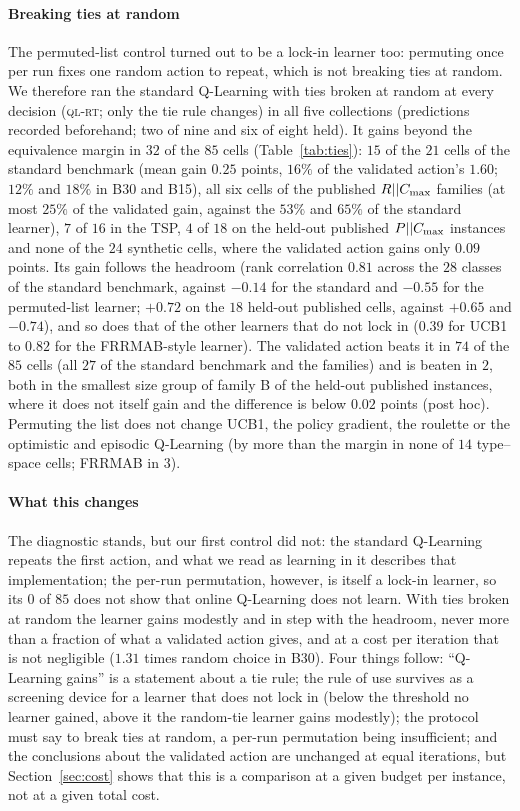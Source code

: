 \paragraph{Breaking ties at random} The permuted-list control turned out to be a lock-in learner too: permuting once per run fixes one random action to repeat, which is not breaking ties at random. We therefore ran the standard Q-Learning with ties broken at random at every decision (\textsc{ql-rt}; only the tie rule changes) in all five collections (predictions recorded beforehand; two of nine and six of eight held). It gains beyond the equivalence margin in $32$ of the $85$ cells (Table~\ref{tab:ties}): $15$ of the $21$ cells of the standard benchmark (mean gain $0.25$ points, $16\%$ of the validated action's $1.60$; $12\%$ and $18\%$ in B30 and B15), all six cells of the published $R||C_{\max}$ families (at most $25\%$ of the validated gain, against the $53\%$ and $65\%$ of the standard learner), $7$ of $16$ in the TSP, $4$ of $18$ on the held-out published $P||C_{\max}$ instances and none of the $24$ synthetic cells, where the validated action gains only $0.09$ points. Its gain follows the headroom (rank correlation $0.81$ across the $28$ classes of the standard benchmark, against $-0.14$ for the standard and $-0.55$ for the permuted-list learner; $+0.72$ on the $18$ held-out published cells, against $+0.65$ and $-0.74$), and so does that of the other learners that do not lock in ($0.39$ for UCB1 to $0.82$ for the FRRMAB-style learner). The validated action beats it in $74$ of the $85$ cells (all $27$ of the standard benchmark and the families) and is beaten in $2$, both in the smallest size group of family B of the held-out published instances, where it does not itself gain and the difference is below $0.02$ points (post hoc). Permuting the list does not change UCB1, the policy gradient, the roulette or the optimistic and episodic Q-Learning (by more than the margin in none of $14$ type--space cells; FRRMAB in $3$).



\paragraph{What this changes} The diagnostic stands, but our first control did not: the standard Q-Learning repeats the first action, and what we read as learning in it describes that implementation; the per-run permutation, however, is itself a lock-in learner, so its $0$ of $85$ does not show that online Q-Learning does not learn. With ties broken at random the learner gains modestly and in step with the headroom, never more than a fraction of what a validated action gives, and at a cost per iteration that is not negligible ($1.31$ times random choice in B30). Four things follow: ``Q-Learning gains'' is a statement about a tie rule; the rule of use survives as a screening device for a learner that does not lock in (below the threshold no learner gained, above it the random-tie learner gains modestly); the protocol must say to break ties at random, a per-run permutation being insufficient; and the conclusions about the validated action are unchanged at equal iterations, but Section~\ref{sec:cost} shows that this is a comparison at a given budget per instance, not at a given total cost.
